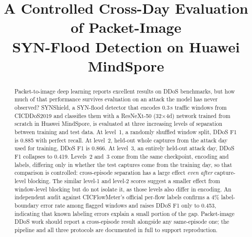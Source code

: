 \documentclass[conference]{IEEEtran} \IEEEoverridecommandlockouts
\begin{document}
\title{A Controlled Cross-Day Evaluation of Packet-Image\\
       SYN-Flood Detection on Huawei MindSpore}

\author{
  \and
  \and
}

\maketitle

\begin{abstract}
Packet-to-image deep learning reports excellent results on DDoS benchmarks, but
how much of that performance survives evaluation on an attack the model has
never observed? SYNShield, a SYN-flood detector that encodes 0.3\,s traffic windows from CICDDoS2019 and classifies them with a ResNeXt-50 (32$\times$4d) network trained from scratch in Huawei MindSpore, is evaluated at three increasing levels of separation between training and test data. At
level~1, a randomly shuffled window split, DDoS F1 is 0.885 with perfect
recall. At level~2, held-out whole captures from the attack day used for
training, DDoS F1 is 0.866. At level~3, an entirely held-out attack day, DDoS
F1 collapses to 0.419. Levels~2 and~3 come from the same checkpoint, encoding and labels, differing
only in whether the test captures come from the training day, so that
comparison is controlled: cross-episode separation has a large effect
\emph{even after} capture-level blocking. The similar level-1 and level-2
scores suggest a smaller effect from window-level blocking but do not isolate
it, as those levels also differ in encoding. An independent audit against CICFlowMeter's official per-flow
labels confirms a 4\% label-boundary error rate among flagged windows and
raises DDoS F1 only to 0.453, indicating that known labeling errors explain a
small portion of the gap. Packet-image DDoS work should report a cross-episode result alongside any
same-episode one; the pipeline and all three protocols are documented in full to support reproduction.
\end{abstract}
\end{document}
